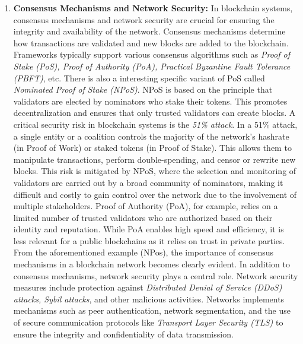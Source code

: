 \begin{enumerate}[label=(\arabic*)]
	\item\textbf{Consensus Mechanisms and Network Security:}\cite{sub_consens}\cite{polkadot_paper}
	In blockchain systems, consensus mechanisms and network security are crucial for ensuring the integrity and availability of the network. Consensus mechanisms determine how transactions are validated and new blocks are added to the blockchain. Frameworks typically support various consensus algorithms such as \textit{Proof of Stake (PoS), Proof of Authority (PoA), Practical Byzantine Fault Tolerance (PBFT)}, etc.
	There is also a interesting specific variant of PoS called \textit{Nominated Proof of Stake (NPoS)}. NPoS is based on the principle that validators are elected by nominators who stake their tokens. This promotes decentralization and ensures that only trusted validators can create blocks. A critical security risk in blockchain systems is the \textit{51\% attack}. In a 51\% attack, a single entity or a coalition controls the majority of the network's hashrate (in Proof of Work) or staked tokens (in Proof of Stake). This allows them to manipulate transactions, perform double-spending, and censor or rewrite new blocks. This risk is mitigated by NPoS, where the selection and monitoring of validators are carried out by a broad community of nominators, making it difficult and costly to gain control over the network due to the involvement of multiple stakeholders.
	Proof of Authority (PoA), for example, relies on a limited number of trusted validators who are authorized based on their identity and reputation. While PoA enables high speed and efficiency, it is less relevant for a public blockchains as it relies on trust in private parties. From the aforementioned example (NPos), the importance of consensus mechanisms in a blockchain network becomes clearly evident.
	In addition to consensus mechanisms, network security plays a central role. Network security measures include protection against \textit{Distributed Denial of Service (DDoS) attacks, Sybil attacks}, and other malicious activities. Networks implements mechanisms such as peer authentication, network segmentation, and the use of secure communication protocols like \textit{Transport Layer Security (TLS)} to ensure the integrity and confidentiality of data transmission.


\end{enumerate}
